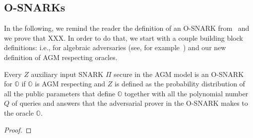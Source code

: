 \subsection{O-SNARKs}
\label{sec:short_snarks_defs}
In the following, we remind the reader the definition of an O-SNARK from~\cite{O_SNARK} and we prove that {\color{red}XXX}.
In order to do that, we start with a couple building block definitions: i.e., for algebraic adversaries (see, for example~\cite{AGM_model}) 
and our new definition of AGM respecting oracles.

\begin{definition}
\label{def:algebraic_adv}
\end{definition}

\begin{definition}
\label{def:agm_oracles}
\end{definition}

\begin{definition}[O-SNARKs]
\label{def:osnarks}
\end{definition}

\begin{theorem}
\label{the:when_osnarks} 
Every $Z$ auxiliary input SNARK $\Pi$ secure in the AGM model is an 
O-SNARK for $\mathbb{O}$ if $\mathbb{O}$ is AGM respecting and 
$Z$ is defined as the probability distribution of all the public parameters that define 
$\mathbb{O}$ together with all the polynomial number $Q$ of queries and answers that 
the adversarial prover in the O-SNARK makes to the oracle $\mathbb{O}$.
\end{theorem}

\begin{proof}
\end{proof}



